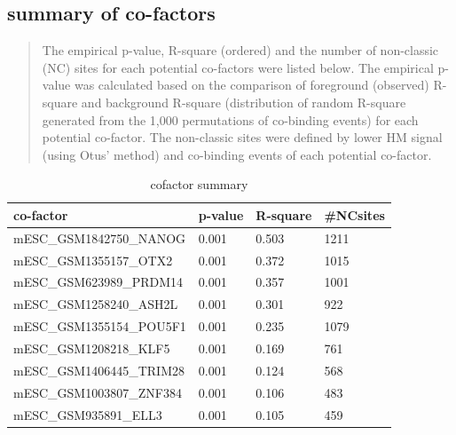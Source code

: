\documentclass[11pt,a4paper]{article}
\begin{document}
\subsection{summary of co-factors}
\begin{quotation}
The empirical p-value, R-square (ordered) and the number of non-classic (NC) sites for each potential co-factors were listed below. The empirical p-value was calculated based on the comparison of foreground (observed) R-square and background R-square (distribution of random R-square generated from the 1,000 permutations of co-binding events) for each potential co-factor. The non-classic sites were defined by lower HM signal (using Otus' method) and co-binding events of each potential co-factor.
\end{quotation}
\begin{table}[h]
\caption{cofactor summary}\label{bstable}
\begin{tabularx}{\textwidth}{ |l|X|X|X| }
    
\hline
co-factor & p-value & R-square & \#NCsites \\
\hline
mESC\_GSM1842750\_NANOG & 0.001 & 0.503 & 1211 \\
\hline
mESC\_GSM1355157\_OTX2 & 0.001 & 0.372 & 1015 \\
\hline
mESC\_GSM623989\_PRDM14 & 0.001 & 0.357 & 1001 \\
\hline
mESC\_GSM1258240\_ASH2L & 0.001 & 0.301 & 922 \\
\hline
mESC\_GSM1355154\_POU5F1 & 0.001 & 0.235 & 1079 \\
\hline
mESC\_GSM1208218\_KLF5 & 0.001 & 0.169 & 761 \\
\hline
mESC\_GSM1406445\_TRIM28 & 0.001 & 0.124 & 568 \\
\hline
mESC\_GSM1003807\_ZNF384 & 0.001 & 0.106 & 483 \\
\hline
mESC\_GSM935891\_ELL3 & 0.001 & 0.105 & 459 \\

\hline
\end{tabularx}
\end{table}
\newpage
\newpage
\end{document}
